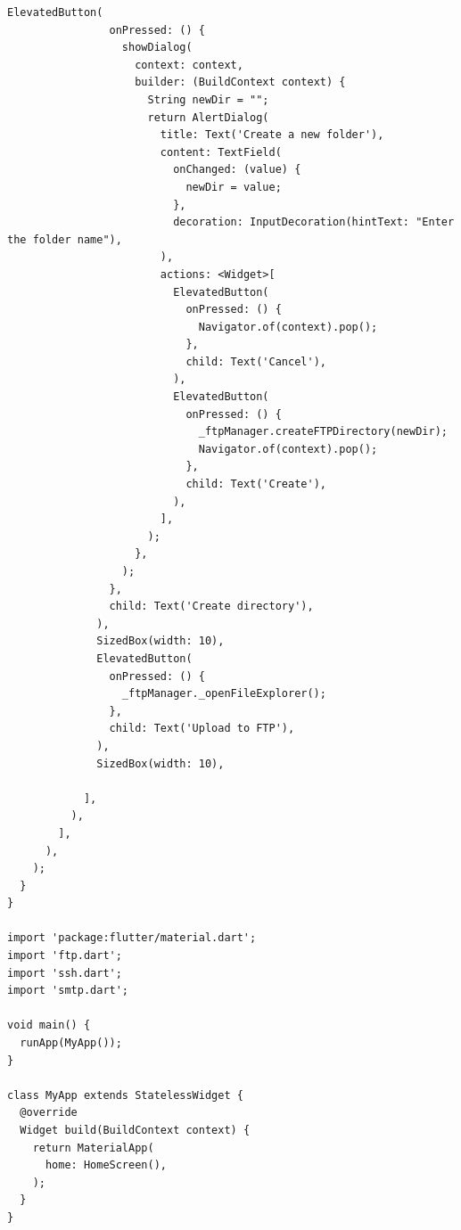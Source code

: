 \documentclass[a4paper, 14pt]{extarticle}
\begin{document}
\begin{lstlisting}[language={},caption={FTP-клиент,  SSH-клиент и SMTP-клиент},label={lst:code1}]
              ElevatedButton(
                onPressed: () {
                  showDialog(
                    context: context,
                    builder: (BuildContext context) {
                      String newDir = "";
                      return AlertDialog(
                        title: Text('Create a new folder'),
                        content: TextField(
                          onChanged: (value) {
                            newDir = value;
                          },
                          decoration: InputDecoration(hintText: "Enter the folder name"),
                        ),
                        actions: <Widget>[
                          ElevatedButton(
                            onPressed: () {
                              Navigator.of(context).pop();
                            },
                            child: Text('Cancel'),
                          ),
                          ElevatedButton(
                            onPressed: () {
                              _ftpManager.createFTPDirectory(newDir);
                              Navigator.of(context).pop();
                            },
                            child: Text('Create'),
                          ),
                        ],
                      );
                    },
                  );
                },
                child: Text('Create directory'),
              ),
              SizedBox(width: 10),
              ElevatedButton(
                onPressed: () {
                  _ftpManager._openFileExplorer();
                },
                child: Text('Upload to FTP'),
              ),
              SizedBox(width: 10),

            ],
          ),
        ],
      ),
    );
  }
}

import 'package:flutter/material.dart';
import 'ftp.dart';
import 'ssh.dart';
import 'smtp.dart';

void main() {
  runApp(MyApp());
}

class MyApp extends StatelessWidget {
  @override
  Widget build(BuildContext context) {
    return MaterialApp(
      home: HomeScreen(),
    );
  }
}


\end{lstlisting}
\end{document}
